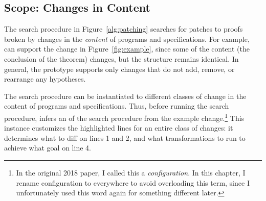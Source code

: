 \begin{figure*}
\begin{minipage}{0.50\textwidth}
\lstset{language=coq, aboveskip=0pt, belowskip=0pt}






\end{minipage}
\hfill
\begin{minipage}{0.50\textwidth}
\lstset{language=coq, aboveskip=0pt, belowskip=0pt}






\end{minipage}
\caption{Two proofs with different conclusions (top) and the
corresponding proof terms (bottom). Highlighted lines correspond to
the change in theorem conclusion (top) and the difference in terms that correspond to a patch (bottom).}
\label{fig:example}
\end{figure*}

\subsection{Scope: Changes in Content}
\label{sec:pumpkin-scope}

The search procedure in Figure~\ref{alg:patching} searches for patches to proofs broken by changes in the \textit{content} of programs and specifications.
For example, \sysname can support the change in Figure~\ref{fig:example}, since some of the content (the conclusion of the theorem) changes,
but the structure remains identical.
In general, the \sysname prototype supports only changes that do not add, remove, or rearrange any hypotheses.

The search procedure can be instantiated to different classes of change in the content of programs and specifications.
Thus, before running the search procedure, \sysname infers an  of the search 
procedure from the example change.\footnote{In the original 2018 \sysnamelong paper, I called this a \textit{configuration}.
In this chapter, I rename configuration to  everywhere to avoid overloading this term,
since I unfortunately used this word again for something different later.}
This instance customizes the highlighted lines for an entire class of changes:
it determines what to diff on lines 1 and 2,
and what transformations to run to achieve what goal on line 4.

